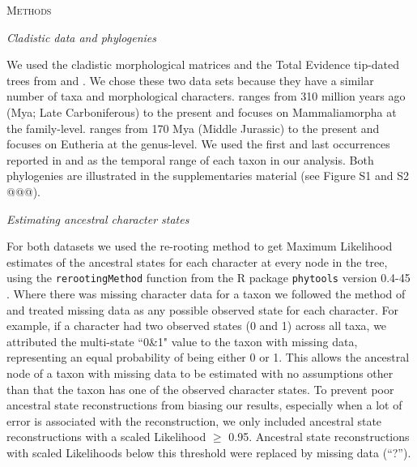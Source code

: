 \documentclass[12pt,letterpaper]{article}
\renewcommand{\section}[1]{%
\bigskip
\begin{center}
\begin{Large}
\normalfont\scshape #1
\medskip
\end{Large}
\end{center}}
\renewcommand{\subsection}[1]{%
\bigskip
\begin{center}
\begin{large}
\normalfont\itshape #1
\end{large}
\end{center}}
\begin{document}
%
%

\section{Methods}

\subsection{Cladistic data and phylogenies}
We used the cladistic morphological matrices and the Total Evidence tip-dated trees \citep{ronquista2012} from \citet[][103 taxa with 446 morphological characters]{Slater2012MEE} and \citet[][102 taxa with 421 morphological characters]{beckancient2014}.
We chose these two data sets because they have a similar number of taxa and morphological characters.
\cite{Slater2012MEE} ranges from 310 million years ago (Mya; Late Carboniferous) to the present and focuses on Mammaliamorpha at the family-level.
\cite{beckancient2014} ranges from 170 Mya (Middle Jurassic) to the present and focuses on Eutheria at the genus-level.
We used the first and last occurrences reported in \cite{Slater2012MEE} and \cite{beckancient2014} as the temporal range of each taxon in our analysis.
Both phylogenies are illustrated in the supplementaries material (see Figure S1 and S2 @@@).

\subsection{Estimating ancestral character states}
For both datasets we used the re-rooting method \citep{Yang01121995,Garland2000} to get Maximum Likelihood estimates of the ancestral states for each character at every node in the tree, using the \texttt{rerootingMethod} function from the R package \texttt{phytools} version 0.4-45 \citep{phytools,R}.
Where there was missing character data for a taxon we followed the method of \cite{Claddis} and treated  missing data as any possible observed state for each character.
For example, if a character had two observed states (0 and 1) across all taxa, we attributed the multi-state ``0\&1" value to the taxon with missing data, representing an equal probability of being either 0 or 1.
This allows the ancestral node of a taxon with missing data to be estimated with no assumptions other than that the taxon has one of the observed character states.
To prevent poor ancestral state reconstructions from biasing our results, especially when a lot of error is associated with the reconstruction, we only included ancestral state reconstructions with a scaled Likelihood $\geq$ 0.95.
Ancestral state reconstructions with scaled Likelihoods below this threshold were replaced by missing data (``?'').
\end{document}
